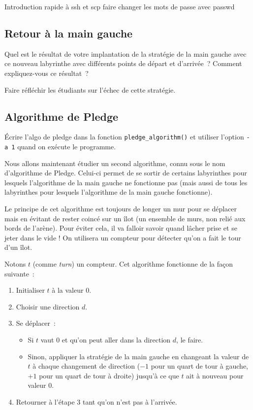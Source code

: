 \documentclass[a4paper]{article}
\newenvironment{enseignants}[1]{\noindent\color{blue}{\bf #1}}{}
\begin{document}
\begin{enseignants}{SSH~:}
  Introduction rapide à ssh et scp
  faire changer les mots de passe avec passwd
\end{enseignants}

\subsection{Retour à la main gauche}

Quel est le résultat de votre implantation de la stratégie de la main gauche avec ce nouveau labyrinthe avec différents points de départ et d'arrivée~? Comment expliquez-vous ce résultat~?

\begin{enseignants}{Suite de la réflexion précédente~:}
Faire réfléchir les étudiants sur l’échec de cette stratégie.
\end{enseignants}

\subsection{Algorithme de Pledge}

\begin{enseignants}{Utilisation du programme~:}
Écrire l'algo de pledge dans la fonction \verb|pledge_algorithm()| et utiliser l'option \verb|-a 1| quand on exécute le programme.
\end{enseignants}

Nous allons maintenant étudier un second algorithme, connu sous le nom d’algorithme de Pledge.
Celui-ci permet de se sortir de certains labyrinthes pour lesquels l'algorithme de la main gauche ne fonctionne pas (mais aussi de tous les labyrinthes pour lesquels l'algorithme de la main gauche fonctionne).

Le principe de cet algorithme est toujours de longer un mur pour se déplacer mais en évitant de rester coincé sur un îlot (un ensemble de murs, non relié aux bords de l'arène).
Pour éviter cela, il va falloir savoir quand lâcher prise et se jeter dans le vide !
On utilisera un compteur pour détecter qu'on a fait le tour d'un îlot.

Notons $t$ (comme \emph{turn}) un compteur. Cet algorithme fonctionne de la façon suivante~:
\begin{enumerate}
\item Initialiser $t$ à la valeur $0$.
\item Choisir une direction $d$.
\item Se déplacer~:
  \begin{itemize}
  \item Si $t$ vaut $0$ et qu'on peut aller dans la direction $d$, le faire.
  \item Sinon, appliquer la stratégie de la main gauche en changeant la valeur de $t$ à chaque changement de direction ($-1$ pour un quart de tour à gauche, $+1$ pour un quart de tour à droite) jusqu'à ce que $t$ ait à nouveau pour valeur $0$.
  \end{itemize}
\item Retourner à l'étape 3 tant qu'on n'est pas à l'arrivée.
\end{enumerate}
\end{document}
